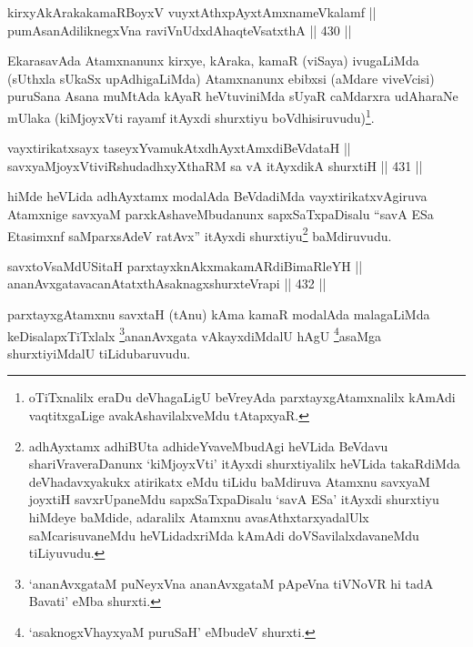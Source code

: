 \begin{shl}
kirxyAkArakakamaRBoyxV vuyxtAthxpAyx\s \s tAmxnameVkalamf || \\
pumAsanAdiliknegxVna raviVnUdxdAhaqteVsatxthA \hfill || 430 ||  
\end{shl}

\begin{artha}
EkarasavAda Atamxnanunx kirxye, kAraka, kamaR (viSaya) ivugaLiMda
(sUthxla sUkaSx upAdhigaLiMda) Atamxnanunx ebibxsi (aMdare viveVcisi)
puruSana Asana muMtAda kAyaR heVtuviniMda sUyaR caMdarxra udAharaNe
mUlaka (kiMjoyxVti rayamf itAyxdi shurxtiyu
boVdhisiruvudu)\footnote{oTiTxnalilx eraDu deVhagaLigU beVreyAda
parxtayxgAtamxnalilx kAmAdi vaqtitxgaLige avakAshavilalxveMdu
tAtapxyaR.}.
\end{artha}

\begin{shl}
vayxtirikatxsayx taseyxYvamukAtxdhAyxtAmxdiBeVdataH || \\
savxyaMjoyxVtiviRshudadhxyXthaRM sa vA itAyxdikA shurxtiH \hfill || 431 ||  
\end{shl}

\begin{artha}
hiMde heVLida adhAyxtamx modalAda BeVdadiMda vayxtirikatxvAgiruva
Atamxnige savxyaM parxkAshaveMbudanunx sapxSaTxpaDisalu ``savA ESa Etasimxnf saMparxsAdeV ratAvx''
itAyxdi shurxtiyu\footnote{adhAyxtamx adhiBUta adhideYvaveMbudAgi
heVLida BeVdavu shariVraveraDanunx `kiMjoyxVti' itAyxdi
shurxtiyalilx heVLida takaRdiMda deVhadavxyakukx atirikatx eMdu
tiLidu baMdiruva Atamxnu savxyaM joyxtiH savxrUpaneMdu
sapxSaTxpaDisalu `savA ESa' itAyxdi shurxtiyu hiMdeye baMdide,
adaralilx Atamxnu avasAthxtarxyadalUlx saMcarisuvaneMdu
heVLidadxriMda kAmAdi doVSavilalxdavaneMdu tiLiyuvudu.} baMdiruvudu.
\end{artha}

\begin{shl}
savxtoV\s saMdUSitaH parxtayxknAkxmakamARdiBimaRleYH || \\
ananAvxgatavacanAtatxthA\s saknagxshurxteVrapi \hfill || 432 ||  
\end{shl}

\begin{artha}
parxtayxgAtamxnu savxtaH (tAnu) kAma kamaR modalAda malagaLiMda
keDisalapxTiTxlalx \footnote{`ananAvxgataM puNeyxVna ananAvxgataM pApeVna tiVNoVR hi tadA Bavati' eMba shurxti.}ananAvxgata vAkayxdiMdalU
hAgU \footnote{`asaknogxVhayxyaM puruSaH' eMbudeV shurxti.}asaMga shurxtiyiMdalU tiLidubaruvudu.
\end{artha}


